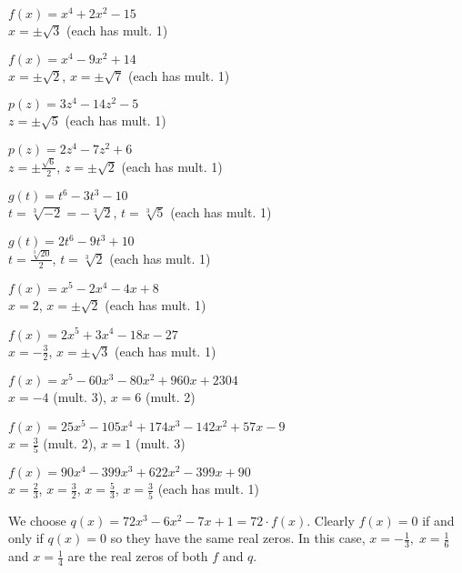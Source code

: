 \begin{exenum}
\item $f(x) = x^4+2x^2 - 15$ \\ $x = \pm \sqrt{3}$ (each has mult. 1)
\item $f(x) = x^4-9x^2+14$ \\ $x = \pm \sqrt{2}$, $x = \pm \sqrt{7}$ (each has mult. 1)

\item $p(z) = 3z^4-14z^2-5$ \\ $z = \pm \sqrt{5}$ (each has mult. 1)
\item $p(z)  = 2z^4-7z^2+6$ \\  $z = \pm \frac{\sqrt{6}}{2}$, $z = \pm \sqrt{2}$ (each has mult. 1)

\item $g(t) = t^6-3t^3-10$ \\ $t = \sqrt[3]{-2} = -\sqrt[3]{2}$, $t = \sqrt[3]{5}$ (each has mult. 1)
\item $g(t) = 2t^6-9t^3+10$ \\ $t =\frac{\sqrt[3]{20}}{2} $, $t = \sqrt[3]{2}$ (each has mult. 1)


\item $f(x) = x^5-2x^4-4x+8$ \\ $x = 2$, $x = \pm \sqrt{2}$ (each has mult. 1)
\item $f(x) = 2x^5+3x^4-18x-27$ \\ $x = -\frac{3}{2}$, $x = \pm \sqrt{3}$ (each has mult. 1)

\item $f(x) = x^{5} - 60x^{3} - 80x^{2} + 960x + 2304 $ \\ $x = -4$ (mult. 3), $x = 6$ (mult. 2)


\item $f(x) = 25x^{5} - 105x^{4} + 174x^{3} - 142x^{2} + 57x - 9$ \\ $x = \frac{3}{5}$ (mult. 2), $x = 1$ (mult. 3)

\item $f(x) = 90x^{4} - 399x^{3} + 622x^{2} - 399x + 90$ \\ $x = \frac{2}{3}$, $x = \frac{3}{2}$, $x = \frac{5}{3}$, $x = \frac{3}{5}$ (each has mult. 1)


\item We choose $q(x) = 72x^{3} - 6x^{2} - 7x + 1 = 72 \cdot f(x)$.  Clearly $f(x) = 0$ if and only if $q(x) = 0$ so they have the same real zeros.  In this case, $x = -\frac{1}{3}, \; x = \frac{1}{6} \;$ and $x = \frac{1}{4}$ are the real zeros of both $f$ and $q$.

\end{exenum}

